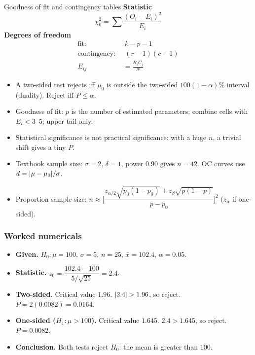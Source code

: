 \begin{formulabox}{Goodness of fit and contingency tables}
\textbf{Statistic}
\[ \chi_0^2=\sum\frac{(O_i-E_i)^2}{E_i} \]
\textbf{Degrees of freedom}
\[ \begin{aligned}\text{fit: }&\ k-p-1\\ \text{contingency: }&\ (r-1)(c-1)\\ E_{ij}&=\frac{R_iC_j}{N}\end{aligned} \]
\end{formulabox}

\begin{notebox}
\begin{itemize}
  \item A two-sided test rejects iff $\mu_0$ is outside the two-sided $100(1-\alpha)\%$ interval (duality). Reject iff $P\le\alpha$.
  \item Goodness of fit: $p$ is the number of estimated parameters; combine cells with $E_i<3$--$5$; upper tail only.
  \item Statistical significance is not practical significance: with a huge $n$, a trivial shift gives a tiny $P$.
  \item Textbook sample size: $\sigma=2$, $\delta=1$, power $0.90$ gives $n=42$. OC curves use $d=\lvert\mu-\mu_0\rvert/\sigma$.
  \item Proportion sample size: $n\approx\Big[\dfrac{z_{\alpha/2}\sqrt{p_0(1-p_0)}+z_\beta\sqrt{p(1-p)}}{p-p_0}\Big]^2$ ($z_\alpha$ if one-sided).
\end{itemize}
\end{notebox}

\subsubsection*{Worked numericals}

\begin{example}
\begin{itemize}
  \item \textbf{Given.} $H_0:\mu=100$, $\sigma=5$, $n=25$, $\bar{x}=102.4$, $\alpha=0.05$.
  \item \textbf{Statistic.} $z_0=\dfrac{102.4-100}{5/\sqrt{25}}=2.4$.
  \item \textbf{Two-sided.} Critical value $1.96$. $\lvert2.4\rvert>1.96$, so reject. $P=2(0.0082)=0.0164$.
  \item \textbf{One-sided ($H_1:\mu>100$).} Critical value $1.645$. $2.4>1.645$, so reject. $P=0.0082$.
  \item \textbf{Conclusion.} Both tests reject $H_0$: the mean is greater than $100$.
\end{itemize}
\end{example}

